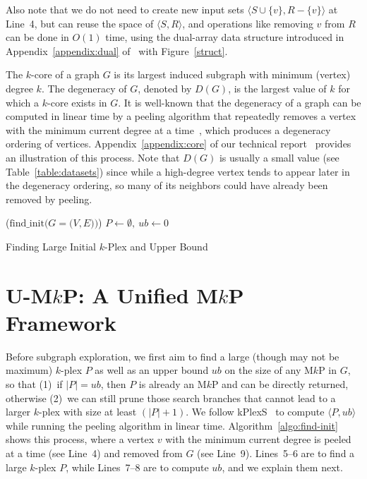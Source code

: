 \documentclass[sigconf, nonacm]{acmart}
\begin{document}
Also note that we do not need to create new input sets $\langle S\cup\{v\}, R-\{v\}\rangle$ at Line~4, but can reuse the space of $\langle S, R\rangle$, and operations like removing $v$ from $R$ can be done in $O(1)$ time, using the dual-array data structure introduced in Appendix~\ref{appendix:dual} of~\cite{tech_report} with Figure~\ref{struct}.

\vspace{1mm}
 The $k$-core of a graph $G$ is its largest induced subgraph with minimum (vertex) degree $k$. The degeneracy of $G$, denoted by $D(G)$, is the largest value of $k$ for which a $k$-core exists in $G$. It is well-known that the degeneracy of a graph can be computed in linear time by a peeling algorithm that repeatedly removes a vertex with the minimum current degree at a time~\cite{bz}, which produces a degeneracy ordering of vertices. Appendix~\ref{appendix:core} of our technical report~\cite{tech_report} provides an illustration of this process. Note that $D(G)$ is usually a small value (see Table~\ref{table:datasets}) since while a high-degree vertex tends to appear later in the  degeneracy ordering, so many of its neighbors could have already been removed by peeling.

\begin{algorithm}[!t]
  \DontPrintSemicolon
  \Begin($\text{find\_init}{(}G={(}V, E{)}{)}$){ %
    $P\gets\emptyset,\ ub\gets 0$\;
}
\caption{Finding Large Initial $k$-Plex and Upper Bound}   
\label{algo:find-init}
\end{algorithm}
\setlength{\textfloatsep}{0pt}

\section{U-M$k$P: A Unified M$k$P Framework}\label{sec:framework}

 Before subgraph exploration, we first aim to find a large (though may not be maximum) $k$-plex $P$ as well as an upper bound $ub$ on the size of any M$k$P in $G$, so that (1)~if $|P|=ub$, then $P$ is already an M$k$P and can be directly returned, otherwise (2)~we can still prune those search branches that cannot lead to a larger $k$-plex with size at least $(|P|+1)$. We follow kPlexS~\cite{kPlexS} to compute $\langle P, ub\rangle$ while running the peeling algorithm in linear time. 
%
Algorithm~\ref{algo:find-init} shows this process, where a vertex $v$ with the minimum current degree is peeled at a time (see Line~4) and removed from $G$ (see Line~9). Lines~5--6 are to find a large $k$-plex $P$, while Lines~7--8 are to compute $ub$, and we explain them next.
\end{document}
